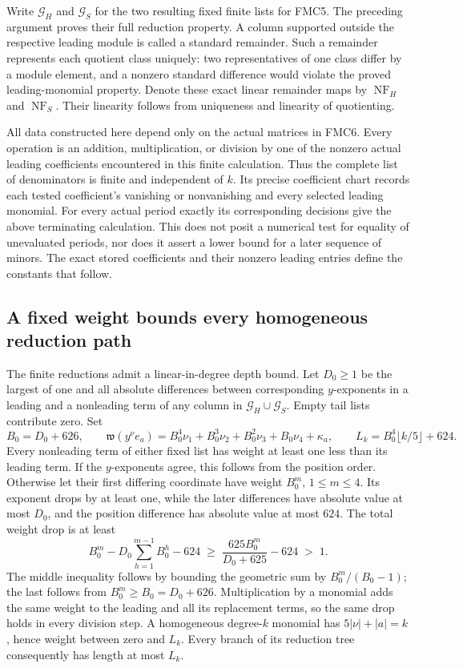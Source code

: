 \documentclass[11pt,a4paper]{article}
\begin{document}
Write $\mathcal G_H$ and $\mathcal G_S$ for the two resulting fixed
finite lists for FMC5. The preceding argument proves their full
reduction property. A column supported outside the respective leading
module is called a standard remainder. Such a remainder represents
each quotient class uniquely: two representatives of one class differ
by a module element, and a nonzero standard difference would violate
the proved leading-monomial property. Denote these exact linear
remainder maps by $\operatorname{NF}_H$ and $\operatorname{NF}_S$.
Their linearity follows from uniqueness and linearity of quotienting.

All data constructed here depend only on the actual matrices in FMC6.
Every operation is an addition, multiplication, or division by one of
the nonzero actual leading coefficients encountered in this finite
calculation. Thus the complete list of denominators is finite and
independent of $k$. Its precise coefficient chart records each tested
coefficient's vanishing or nonvanishing and every selected leading
monomial. For every actual period exactly its corresponding decisions
give the above terminating calculation. This does not posit a
numerical test for equality of unevaluated periods, nor does it assert
a lower bound for a later sequence of minors. The exact stored
coefficients and their nonzero leading entries define the constants
that follow.

\subsection{A fixed weight bounds every homogeneous reduction path}

The finite reductions admit a linear-in-degree depth bound. Let
$D_0\ge1$ be the largest of one and all absolute differences between
corresponding $y$-exponents in a leading and a nonleading term of
any column in $\mathcal G_H\cup\mathcal G_S$. Empty tail lists
contribute zero. Set
\[
 B_0=D_0+626,\qquad
 \mathfrak w(y^\nu e_a)
   =B_0^4\nu_1+B_0^3\nu_2+B_0^2\nu_3+B_0\nu_4+\kappa_a,
 \qquad L_k=B_0^4\lfloor k/5\rfloor+624.
 \tag{FMC9}
\]
Every nonleading term of either fixed list has weight at least one
less than its leading term. If the $y$-exponents agree, this follows
from the position order. Otherwise let their first differing
coordinate have weight $B_0^m$, $1\le m\le4$. Its exponent drops by
at least one, while the later differences have absolute value at
most $D_0$, and the position difference has absolute value at most
$624$. The total weight drop is at least
\[
 B_0^m-D_0\sum_{h=1}^{m-1}B_0^h-624
 \;\ge\;\frac{625B_0^m}{D_0+625}-624\;>\;1.
 \tag{FMC10}
\]
The middle inequality follows by bounding the geometric sum by
$B_0^m/(B_0-1)$; the last follows from $B_0^m\ge B_0=D_0+626$.
Multiplication by a monomial adds the same weight to the leading
and all its replacement terms, so the same drop holds in every
division step. A homogeneous degree-$k$ monomial has
$5|\nu|+|a|=k$, hence weight between zero and $L_k$. Every branch
of its reduction tree consequently has length at most $L_k$.
\end{document}

